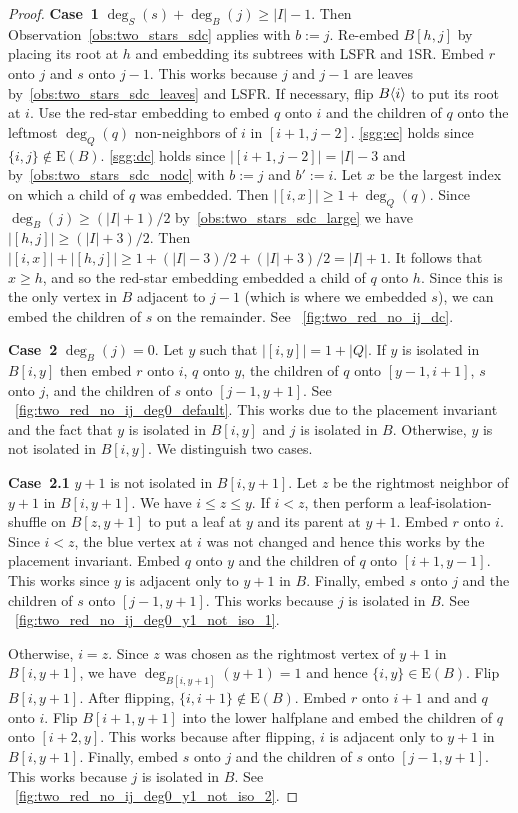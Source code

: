 \documentclass[11pt,a4paper,colorlinks=true,urlcolor=blue,citecolor=red]{article}
\theoremstyle{plain}
\newcommand{\case}[1]{\par\vspace{.5\baselineskip}\noindent\textbf{\sffamily Case~#1}}
\newcommand{\EB}{\mathrm{E}(B)}
\begin{document}
\begin{proof}
  \case{1} $\deg_S(s)+\deg_B(j)\geq |I|-1$. Then
  Observation~\ref{obs:two_stars_sdc} applies with $b:=j$. Re-embed
  $B[h,j]$ by placing its root at $h$ and embedding its subtrees with
  LSFR and 1SR. Embed $r$ onto $j$ and $s$ onto $j-1$. This works
  because $j$ and $j-1$ are leaves by~\ref{obs:two_stars_sdc_leaves} and
  LSFR. If necessary, flip $B\langle{i}\rangle$ to put its root at $i$. Use
  the red-star embedding to embed $q$ onto $i$ and the children
  of $q$ onto the leftmost $\deg_Q(q)$ non-neighbors of $i$ in
  $[i+1,j-2]$. \ref{sgg:ec} holds since $\{i,j\}\not\in\EB$.
  \ref{sgg:dc} holds since $|[i+1,j-2]|=|I|-3$ and
  by~\ref{obs:two_stars_sdc_nodc} with $b:=j$ and $b':=i$. Let $x$ be
  the largest index on which a child of $q$ was embedded. Then
  $|[i,x]|\geq 1+\deg_Q(q)$. Since $\deg_B(j)\geq(|I|+1)/2$
  by~\ref{obs:two_stars_sdc_large} we have $|[h,j]|\geq(|I|+3)/2$. Then
  $|[i,x]|+|[h,j]|\geq 1+(|I|-3)/2+(|I|+3)/2=|I|+1$. It follows that
  $x\geq h$, and so the red-star embedding embedded a child of
  $q$ onto $h$. Since this is the only vertex in $B$ adjacent to
  $j-1$ (which is where we embedded $s$), we can embed the children of
  $s$ on the remainder. See \figurename~\ref{fig:two_red_no_ij_dc}.

  \case{2} $\deg_B(j)=0$. Let $y$ such that $|[i,y]|=1+|Q|$. If $y$ is
  isolated in $B[i,y]$ then embed $r$ onto $i$, $q$ onto $y$, the
  children of $q$ onto $[y-1,i+1]$, $s$ onto $j$, and the children of
  $s$ onto $[j-1,y+1]$. See
  \figurename~\ref{fig:two_red_no_ij_deg0_default}. This works due to
  the placement invariant and the fact that $y$ is isolated in $B[i,y]$
  and $j$ is isolated in $B$. Otherwise, $y$ is not isolated in
  $B[i,y]$. We distinguish two cases.

  \case{2.1} $y+1$ is not isolated in $B[i,y+1]$. Let $z$ be the
  rightmost neighbor of $y+1$ in $B[i,y+1]$. We have $i\leq z\leq y$. If
  $i<z$, then perform a leaf-isolation-shuffle on $B[z,y+1]$ to put a
  leaf at $y$ and its parent at $y+1$. Embed $r$ onto $i$. Since $i<z$,
  the blue vertex at $i$ was not changed and hence this works by the
  placement invariant. Embed $q$ onto $y$ and the children of $q$ onto
  $[i+1,y-1]$. This works since $y$ is adjacent only to $y+1$ in
  $B$. Finally, embed $s$ onto $j$ and the children of $s$ onto
  $[j-1,y+1]$. This works because $j$ is isolated in $B$. See
  \figurename~\ref{fig:two_red_no_ij_deg0_y1_not_iso_1}.

  Otherwise, $i=z$. Since $z$ was chosen as the rightmost vertex of
  $y+1$ in $B[i,y+1]$, we have $\deg_{B[i,y+1]}(y+1)=1$ and hence
  $\{i,y\}\in\EB$. Flip $B[i,y+1]$. After flipping,
  $\{i,i+1\}\not\in\EB$. Embed $r$ onto $i+1$ and and $q$ onto $i$. Flip
  $B[i+1,y+1]$ into the lower halfplane and embed the children of $q$
  onto $[i+2,y]$. This works because after flipping, $i$ is adjacent
  only to $y+1$ in $B[i,y+1]$. Finally, embed $s$ onto $j$ and the
  children of $s$ onto $[j-1,y+1]$. This works because $j$ is isolated
  in $B$. See
  \figurename~\ref{fig:two_red_no_ij_deg0_y1_not_iso_2}.


\end{proof}
\end{document}
